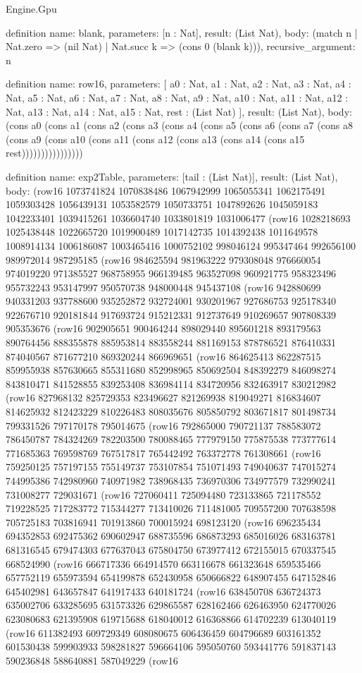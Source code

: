 \begin{lexlean}{Engine.Gpu}
\begin{semanticmodule}
definition{
  name: blank,
  parameters: [n : Nat],
  result: (List Nat),
  body: (match n | Nat.zero => (nil Nat) | Nat.succ k => (cons 0 (blank k))),
  recursive_argument: n
}

definition{
  name: row16,
  parameters: [
    a0 : Nat,
    a1 : Nat,
    a2 : Nat,
    a3 : Nat,
    a4 : Nat,
    a5 : Nat,
    a6 : Nat,
    a7 : Nat,
    a8 : Nat,
    a9 : Nat,
    a10 : Nat,
    a11 : Nat,
    a12 : Nat,
    a13 : Nat,
    a14 : Nat,
    a15 : Nat,
    rest : (List Nat)
  ],
  result: (List Nat),
  body: (cons a0 (cons a1 (cons a2 (cons a3 (cons a4 (cons a5 (cons a6 (cons a7 (cons a8 (cons a9 (cons a10 (cons a11 (cons a12 (cons a13 (cons a14 (cons a15 rest))))))))))))))))
}

definition{
  name: exp2Table,
  parameters: [tail : (List Nat)],
  result: (List Nat),
  body: (row16 1073741824 1070838486 1067942999 1065055341 1062175491 1059303428 1056439131 1053582579 1050733751 1047892626 1045059183 1042233401 1039415261 1036604740 1033801819 1031006477 (row16 1028218693 1025438448 1022665720 1019900489 1017142735 1014392438 1011649578 1008914134 1006186087 1003465416 1000752102 998046124 995347464 992656100 989972014 987295185 (row16 984625594 981963222 979308048 976660054 974019220 971385527 968758955 966139485 963527098 960921775 958323496 955732243 953147997 950570738 948000448 945437108 (row16 942880699 940331203 937788600 935252872 932724001 930201967 927686753 925178340 922676710 920181844 917693724 915212331 912737649 910269657 907808339 905353676 (row16 902905651 900464244 898029440 895601218 893179563 890764456 888355878 885953814 883558244 881169153 878786521 876410331 874040567 871677210 869320244 866969651 (row16 864625413 862287515 859955938 857630665 855311680 852998965 850692504 848392279 846098274 843810471 841528855 839253408 836984114 834720956 832463917 830212982 (row16 827968132 825729353 823496627 821269938 819049271 816834607 814625932 812423229 810226483 808035676 805850792 803671817 801498734 799331526 797170178 795014675 (row16 792865000 790721137 788583072 786450787 784324269 782203500 780088465 777979150 775875538 773777614 771685363 769598769 767517817 765442492 763372778 761308661 (row16 759250125 757197155 755149737 753107854 751071493 749040637 747015274 744995386 742980960 740971982 738968435 736970306 734977579 732990241 731008277 729031671 (row16 727060411 725094480 723133865 721178552 719228525 717283772 715344277 713410026 711481005 709557200 707638598 705725183 703816941 701913860 700015924 698123120 (row16 696235434 694352853 692475362 690602947 688735596 686873293 685016026 683163781 681316545 679474303 677637043 675804750 673977412 672155015 670337545 668524990 (row16 666717336 664914570 663116678 661323648 659535466 657752119 655973594 654199878 652430958 650666822 648907455 647152846 645402981 643657847 641917433 640181724 (row16 638450708 636724373 635002706 633285695 631573326 629865587 628162466 626463950 624770026 623080683 621395908 619715688 618040012 616368866 614702239 613040119 (row16 611382493 609729349 608080675 606436459 604796689 603161352 601530438 599903933 598281827 596664106 595050760 593441776 591837143 590236848 588640881 587049229 (row16 }
\end{semanticmodule}
\end{lexlean}
